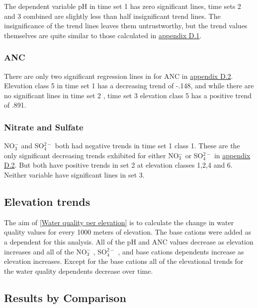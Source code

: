 The dependent variable pH in time set 1 has zero significant lines, time sets 2 and 3 combined are slightly less than half insignificant trend lines. 
The insignificance of the trend lines leaves them untrustworthy, but the trend values themselves are quite similar to those calculated in \hyperref[app:Step-wise julian date]{appendix D.1}.

\subsubsection{ANC}

There are only two significant regression lines in for ANC in  \hyperref[app:time vars]{appendix D.2}. 
Elevation class 5 in time set 1 has a decreasing trend of -.148,  and while there are no significant lines in time set 2 , time set 3 elevation class 5 has a positive trend of .891.

\subsubsection{Nitrate and Sulfate}

NO$_3^-$ and SO$_4^{2-}$ both had negative trends in time set 1 class 1. 
These are the only significant decreasing trends exhibited for either NO$_3^-$ or SO$_4^{2-}$  in  \hyperref[app:time vars]{appendix D.2}.  
But both have positive trends in set 2 at elevation classes 1,2,4 and 6.
Neither variable have significant lines in set 3.

\subsection{Elevation trends}

The aim of \autoref{Water quality per elevation} is to calculate the change in water quality values for every 1000 meters of elevation.  
The base cations were added as a dependent for this analysis. 
All of the pH and ANC values decrease as elevation increases and all of the  NO$_3^-$ , SO$_4^{2-}$ , and base cations dependents increase as elevation increases. 
Except for the base cations all of the elevational trends for the water quality dependents decrease over time.

\subsection{Results by Comparison}

